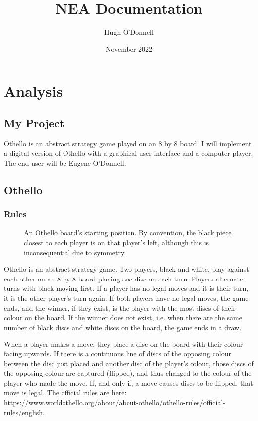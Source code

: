 \documentclass[12pt, a4paper]{report}
\begin{document}
\title{NEA Documentation}
\author{Hugh O'Donnell}
\date{November 2022}
\maketitle
\tableofcontents
\chapter{Analysis}
\section{My Project}
Othello is an abstract strategy game played on an 8 by 8 board.
I will implement a digital version of Othello with a graphical user interface and a computer player.
The end user will be Eugene O'Donnell.
\section{Othello}
\subsection{Rules}

\begin{wrapfigure}{r}{0pt}
	\centering
	
	\caption{An Othello board's starting position. By convention, the black piece closest to each player is on that player's left,
	although this is inconsequential due to symmetry.}
	\label{fig:init}
\end{wrapfigure}

Othello is an abstract strategy game. Two players, black and white, play against each other on an 8 by 8 board placing one disc on each turn.
Players alternate turns with black moving first. If a player has no legal moves and it is their turn, it is the other player's turn again.
If both players have no legal moves, the game ends, and the winner, if they exist, is the player with the most discs of their colour on the board.
If the winner does not exist, i.e. when there are the same number of black discs and white discs on the board, the game ends in a draw.


When a player makes a move, they place a disc on the board with their colour facing upwards.
If there is a continuous line of discs of the opposing colour between the disc just placed and another disc of the player’s colour, those discs of the opposing colour are captured (flipped), and thus changed to the colour of the player who made the move.
If, and only if, a move  causes discs to be flipped, that move is legal.
The official rules are here: \url{https://www.worldothello.org/about/about-othello/othello-rules/official-rules/english}.
\end{document}

